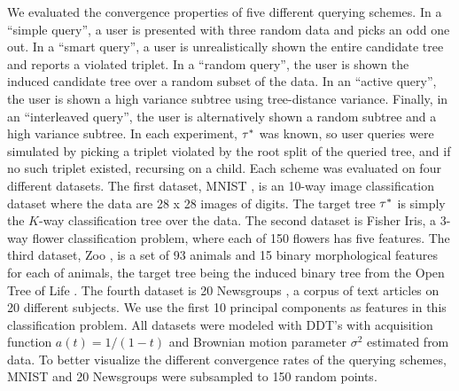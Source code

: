 We evaluated the convergence properties of five different querying schemes.
In a ``simple query'', a user is presented with three random data
and picks an odd one out.
In a ``smart query'', a user is unrealistically shown the entire candidate tree and reports a violated triplet.
In a ``random query'', the user is shown the induced candidate tree over
a random subset of the data.
In an ``active query'', the user is shown a high variance 
subtree using tree-distance variance.
Finally, in an ``interleaved query'', the user is alternatively shown a random
subtree and a high variance subtree.
In each experiment, $\tau^*$ was known, so user queries were simulated
by picking a triplet
violated by the root split of the queried tree, 
and if no such triplet existed, recursing on a child.
Each scheme was evaluated on four different datasets.
The first dataset, MNIST \citep{Lecun1998}, is an 10-way image classification
dataset where the data are 28 x 28 images of digits.
The target tree $\tau^*$ is simply the $K$-way classification 
tree over the data.
The second dataset is Fisher Iris, a 3-way flower
classification problem, where each of 150 flowers has
five features.
The third dataset, Zoo \citep{Lichman2013}, is a set of 93 animals
and 15 binary morphological features for each of animals,
the target tree being the induced binary tree 
from the Open Tree of Life \citep{Hinchliff2015}.
The fourth dataset is 20 Newsgroups \citep{Joachims1997}, a
corpus of text articles on 20 different subjects. We use
the first 10 principal components as features
in this classification problem.
All datasets were modeled with DDT's with
acquisition function $a(t) = 1/(1 - t)$
and Brownian motion parameter $\sigma^2$ estimated from data.
To better visualize the different convergence rates
of the querying schemes, MNIST and 20 Newsgroups were subsampled
to 150 random points.

